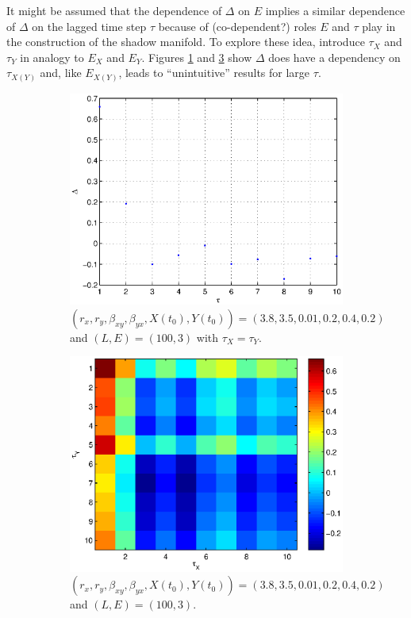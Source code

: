 \documentclass[a4paper,11pt]{article}
\begin{document}
It might be assumed that the dependence of $\Delta$ on $E$ implies a similar dependence of $\Delta$ on the lagged time step $\tau$ because of (co-dependent?) roles $E$ and $\tau$ play in the construction of the shadow manifold.  To explore these idea, introduce $\tau_X$ and $\tau_Y$ in analogy to $E_X$ and $E_Y$.  Figures \ref{fig:SugExvTauXY} and \ref{fig:SugExvTauXvTauY} show $\Delta$ does have a dependency on $\tau_{X (Y)}$ and, like $E_{X(Y)}$, leads to ``unintuitive'' results for large $\tau$.
\begin{figure}[h!t]
\centering
\begin{subfigure}[b]{0.4\textwidth}
\label{fig:SugExvTauXY}
\includegraphics[scale=0.55]{SugExvTauXY.eps}
\caption{ $\left(r_x,r_y,\beta_{xy},\beta_{yx},X(t_0),Y(t_0)\right) = \left(3.8,3.5,0.01,0.2,0.4,0.2\right)$ and $\left(L,E\right) = \left(100,3\right)$ with $\tau_X=\tau_Y$.}
\end{subfigure}
\begin{subfigure}[b]{0.4\textwidth}
\label{fig:SugExvTauXvTauY}
\includegraphics[scale=0.55]{SugExvTauXvTauY.eps}
\caption{ $\left(r_x,r_y,\beta_{xy},\beta_{yx},X(t_0),Y(t_0)\right) = \left(3.8,3.5,0.01,0.2,0.4,0.2\right)$ and $\left(L,E\right) = \left(100,3\right)$.}
\end{subfigure}
\caption{}
\end{figure}
\end{document}
